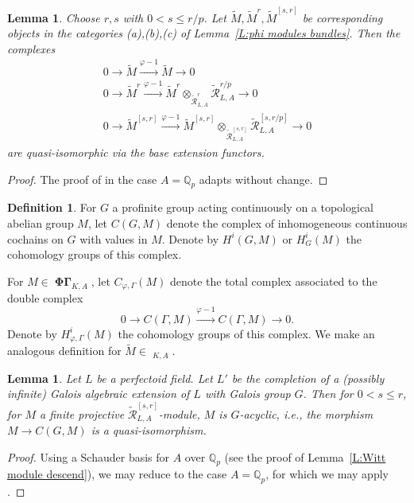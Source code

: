 \documentclass[12pt]{amsart}
\newtheorem{lemma}[theorem]{Lemma}
\theoremstyle{definition}
\newtheorem{defn}[theorem]{Definition}
\numberwithin{equation}{theorem}
\newcommand{\QQ}{\mathbb{Q}}
\newcommand{\calR}{\mathcal{R}}
\DeclareMathOperator{\PhiGamma}{\mathbf{\Phi \Gamma}}
\DeclareMathOperator{\PhiGammatilde}{\widetilde{\mathbf{\Phi \Gamma}}}
\begin{document}
\begin{lemma} \label{L:truncate cohomology}
Choose $r,s$ with $0 < s \leq r/p$. Let $\tilde{M}, \tilde{M}^r, \tilde{M}^{[s,r]}$
be corresponding objects in the categories (a),(b),(c) of Lemma~\ref{L:phi modules bundles}.
Then the complexes
\begin{gather*}
0 \to \tilde{M} \stackrel{\varphi-1}{\to} \tilde{M} \to 0 \\
0 \to \tilde{M}^r \stackrel{\varphi-1}{\to} \tilde{M}^r \otimes_{\tilde{\calR}^r_{L,A}} \tilde{\calR}^{r/p}_{L,A} \to 0 \\
0 \to \tilde{M}^{[s,r]} \stackrel{\varphi-1}{\to} \tilde{M}^{[s,r]} \otimes_{\tilde{\calR}^{[s,r]}_{L,A}} \tilde{\calR}^{[s,r/p]}_{L,A} \to 0
\end{gather*}
are quasi-isomorphic via the base extension functors.
\end{lemma}
\begin{proof}
The proof of \cite[Proposition~6.3.19]{kedlaya-liu1} in the case $A = \QQ_p$ adapts without change.
\end{proof}

\begin{defn}
For $G$ a profinite group acting continuously on a topological abelian group $M$,
let $C(G,M)$ denote the complex of inhomogeneous continuous cochains on $G$ with values in $M$. Denote by $H^i(G,M)$ or $H^i_G(M)$ the cohomology groups of this complex.

For $M \in \PhiGamma_{K,A}$, let $C_{\varphi, \Gamma}(M)$ denote the total complex associated to the double complex
\[
0 \to C(\Gamma, M) \stackrel{\varphi-1}{\to} C(\Gamma,M) \to 0.
\]
Denote by $H^i_{\varphi, \Gamma}(M)$ the cohomology groups of this complex.
We make an analogous definition for $\tilde{M} \in \PhiGammatilde_{K,A}$.
\end{defn}

\begin{lemma} \label{L:perfect descend cohomology}
Let $L$ be a perfectoid field.
Let $L'$ be the completion of a (possibly infinite) Galois algebraic extension of $L$ with Galois group $G$. Then for $0 < s \leq r$, for $M$ a finite projective $\tilde{\calR}^{[s,r]}_{L,A}$-module, $M$ is $G$-acyclic, i.e.,
the morphism $M \to C(G,M)$ is a quasi-isomorphism.
\end{lemma}
\begin{proof}
Using a Schauder basis for $A$ over $\QQ_p$ (see the proof of Lemma~\ref{L:Witt module descend}), we may reduce to the case $A = \QQ_p$,
for which we may apply \cite[Theorem~8.2.22]{kedlaya-liu1}.
\end{proof}
\end{document}
